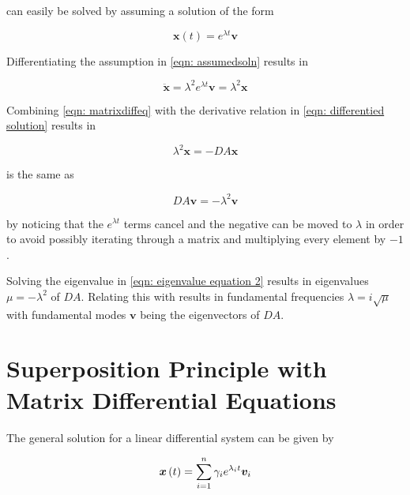 \documentclass[10pt,a4paper]{article}
\renewcommand{\vec}[1]{\boldsymbol{#1}}
\begin{document}
\begin{multicols*}{2}
 can easily be solved by assuming a solution of the form

\begin{equation}
	\vec{x} (t) = e^{\lambda t} \vec{v}
	\label{eqn: assumedsoln}
\end{equation}

Differentiating the assumption in \cref{eqn: assumedsoln} results in

\begin{equation}
	\ddot{\vec{x}} = \lambda^2 e^{\lambda t} \vec{v} = \lambda^2 \vec{x}
	\label{eqn: differentied solution}
\end{equation}

Combining \cref{eqn: matrixdiffeq} with the derivative relation in \cref{eqn: differentied solution} results in

\begin{equation}
	\lambda^2 \vec{x} = -DA \vec{x}
	\label{eqn: eigenvalue equation 1}
\end{equation}

 is the same as

\begin{equation}
	DA \vec{v} = - \lambda^2 \vec{v}
	\label{eqn: eigenvalue equation 2}
\end{equation}

by noticing that the $e^{\lambda t}$ terms cancel and the negative can be moved to $\lambda$ in order to avoid possibly iterating through a matrix and multiplying every element by $-1$.

Solving the eigenvalue in \cref{eqn: eigenvalue equation 2} results in eigenvalues $\mu = -\lambda^2$ of $DA$. Relating this with  results in fundamental frequencies $\lambda = i \sqrt{\mu}$ with fundamental modes $\vec{v}$ being the eigenvectors of $DA$.

\section*{Superposition Principle with Matrix Differential Equations}

The general solution for a linear differential system can be given by

\begin{equation}
	\vec{x}\paren{t} = \sum\limits_{i=1}^n \gamma_i e^{\lambda_i t} \vec{v}_i
	\label{eqn: Superposition}
\end{equation}


\end{multicols*}
\end{document}
